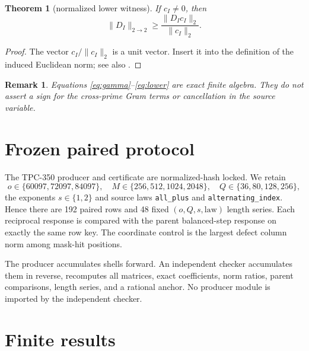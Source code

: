 \documentclass[10pt]{article}
\newtheorem{theorem}{Theorem}
\newtheorem{remark}{Remark}
\begin{document}
\begin{theorem}[normalized lower witness]
If $c_I\ne0$, then
\begin{equation}
 \|D_I\|_{2\to2}\geq\frac{\|D_Ic_I\|_2}{\|c_I\|_2}.
 \label{eq:lower}
\end{equation}
\end{theorem}
\begin{proof}
The vector $c_I/\|c_I\|_2$ is a unit vector.  Insert it into the definition
of the induced Euclidean norm; see also \cite{conway2000}.
\end{proof}

\begin{remark}
Equations \eqref{eq:gamma}--\eqref{eq:lower} are exact finite algebra.  They
do not assert a sign for the cross-prime Gram terms or cancellation in the
source variable.
\end{remark}

\section{Frozen paired protocol}

The TPC-350 producer and certificate are normalized-hash locked.  We retain
\[
 o\in\{60097,72097,84097\},\quad
 M\in\{256,512,1024,2048\},\quad
 Q\in\{36,80,128,256\},
\]
the exponents $s\in\{1,2\}$ and source laws \texttt{all\_plus} and
\texttt{alternating\_index}.  Hence there are 192 paired rows and 48 fixed
$(o,Q,s,\text{law})$ length series.  Each reciprocal response is compared
with the parent balanced-step response on exactly the same row key.  The
coordinate control is the largest defect column norm among mask-hit
positions.

The producer accumulates shells forward.  An independent checker accumulates
them in reverse, recomputes all matrices, exact coefficients, norm ratios,
parent comparisons, length series, and a rational anchor.  No producer module
is imported by the independent checker.

\section{Finite results}
\end{document}
